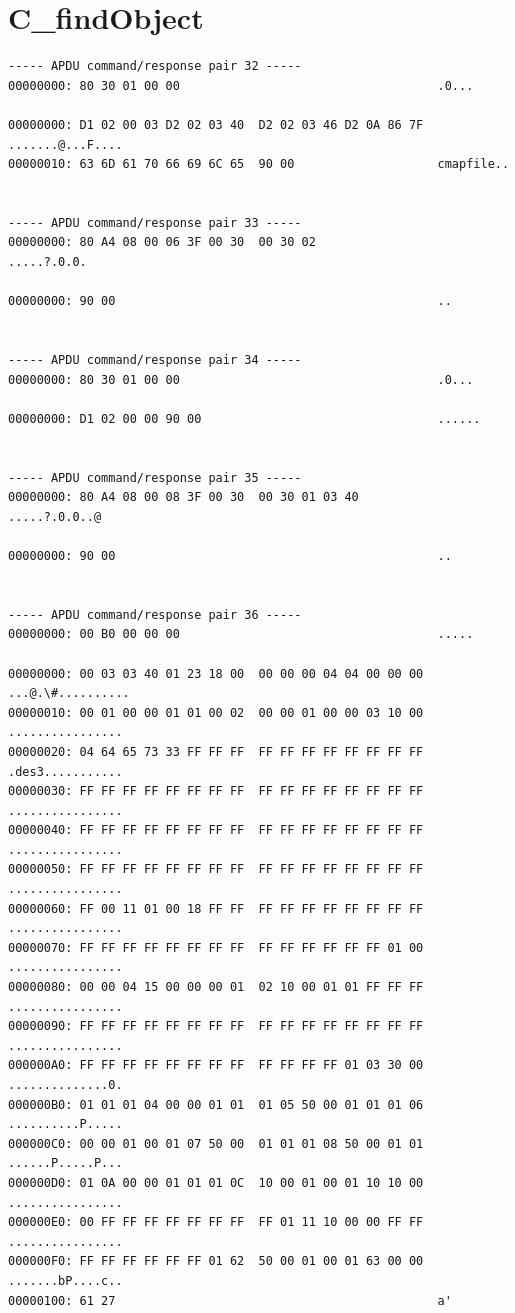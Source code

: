 \documentclass[bsc,frontabs,twoside,singlespacing,parskip,deptreport]{infthesis}     %
\begin{document}
\begin{appendices}
\begin{Verbatim}[commandchars=\\\{\}, fontsize=\small]
\end{Verbatim}

\section{C\_findObject}
\begin{Verbatim}[commandchars=\\\{\}, fontsize=\small]
----- APDU command/response pair 32 -----
00000000: 80 30 01 00 00                                    .0...

00000000: D1 02 00 03 D2 02 03 40  D2 02 03 46 D2 0A 86 7F  .......@...F....
00000010: 63 6D 61 70 66 69 6C 65  90 00                    cmapfile..


----- APDU command/response pair 33 -----
00000000: 80 A4 08 00 06 3F 00 30  00 30 02                 .....?.0.0.

00000000: 90 00                                             ..


----- APDU command/response pair 34 -----
00000000: 80 30 01 00 00                                    .0...

00000000: D1 02 00 00 90 00                                 ......


----- APDU command/response pair 35 -----
00000000: 80 A4 08 00 08 3F 00 30  00 30 01 03 40           .....?.0.0..@

00000000: 90 00                                             ..


----- APDU command/response pair 36 -----
00000000: 00 B0 00 00 00                                    .....

00000000: 00 03 03 40 01 23 18 00  00 00 00 04 04 00 00 00  ...@.\#..........
00000010: 00 01 00 00 01 01 00 02  00 00 01 00 00 03 10 00  ................
00000020: 04 64 65 73 33 FF FF FF  FF FF FF FF FF FF FF FF  .des3...........
00000030: FF FF FF FF FF FF FF FF  FF FF FF FF FF FF FF FF  ................
00000040: FF FF FF FF FF FF FF FF  FF FF FF FF FF FF FF FF  ................
00000050: FF FF FF FF FF FF FF FF  FF FF FF FF FF FF FF FF  ................
00000060: FF 00 11 01 00 18 FF FF  FF FF FF FF FF FF FF FF  ................
00000070: FF FF FF FF FF FF FF FF  FF FF FF FF FF FF 01 00  ................
00000080: 00 00 04 15 00 00 00 01  02 10 00 01 01 FF FF FF  ................
00000090: FF FF FF FF FF FF FF FF  FF FF FF FF FF FF FF FF  ................
000000A0: FF FF FF FF FF FF FF FF  FF FF FF FF 01 03 30 00  ..............0.
000000B0: 01 01 01 04 00 00 01 01  01 05 50 00 01 01 01 06  ..........P.....
000000C0: 00 00 01 00 01 07 50 00  01 01 01 08 50 00 01 01  ......P.....P...
000000D0: 01 0A 00 00 01 01 01 0C  10 00 01 00 01 10 10 00  ................
000000E0: 00 FF FF FF FF FF FF FF  FF 01 11 10 00 00 FF FF  ................
000000F0: FF FF FF FF FF FF 01 62  50 00 01 00 01 63 00 00  .......bP....c..
00000100: 61 27                                             a'



\end{Verbatim}
\end{appendices}
\end{document}
